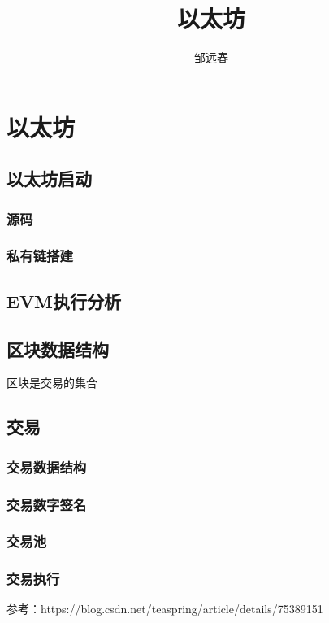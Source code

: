 \documentclass[UTF8]{ctexart}
\title{以太坊}
\author{邹远春}
\date{}
\begin{document}
\maketitle
\else
\chapter{以太坊}
\fi
\section{以太坊启动}

\subsection{源码}

\subsection{私有链搭建}

\section{EVM执行分析}

\section{区块数据结构}

区块是交易的集合

\section{交易}

\subsection{交易数据结构}

\subsection{交易数字签名}

\subsection{交易池}

\subsection{交易执行}

参考：https://blog.csdn.net/teaspring/article/details/75389151

\ifx\allfiles\undefined
\end{document}
